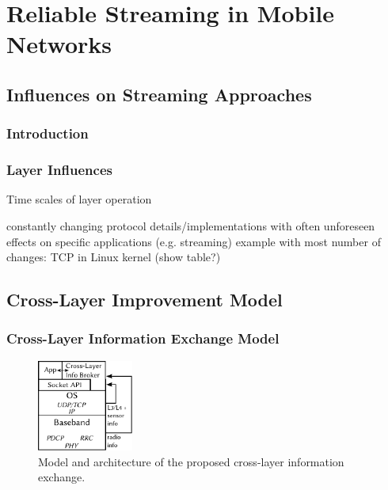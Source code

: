 \documentclass{beamer}
\begin{document}
\section{Reliable Streaming in Mobile Networks}
\subsection{Influences on Streaming Approaches}

\begin{frame}
	\frametitle{Introduction}
\end{frame}

\begin{frame}
	\frametitle{Layer Influences}

	Time scales of layer operation

	constantly changing protocol details/implementations with often unforeseen effects on specific applications (e.g. streaming)
	example with most number of changes: TCP in Linux kernel (show table?)
\end{frame}



\subsection{Cross-Layer Improvement Model}


\begin{frame}
	\frametitle{Cross-Layer Information Exchange Model}

	\begin{figure}
		\centering
		\includegraphics[height=3cm]{../../chapters/05-mobilestreaming/images/cross-layer-model.pdf}
		\caption{Model and architecture of the proposed cross-layer information exchange.}
	\end{figure}
\end{frame}
\end{document}
